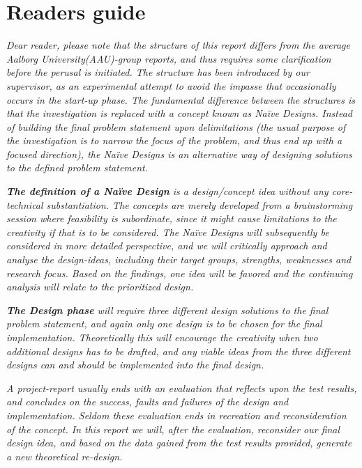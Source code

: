 \section{Readers guide}
\textit{Dear reader, please note that the structure of this report differs from the average Aalborg University(AAU)-group reports, and thus requires some clarification before the perusal is initiated. 
The structure has been introduced by our supervisor, as an experimental attempt to avoid the impasse that occasionally occurs in the start-up phase.
The fundamental difference between the structures is that the investigation is replaced with a concept known as Naïve Designs. Instead of building the final problem statement upon delimitations (the usual purpose of the investigation is to narrow the focus of the problem, and thus end up with a focused direction), the Naïve Designs is an alternative way of designing solutions to the defined problem statement.}
\bigskip

\textit{\textbf{The definition of a Naïve Design} is a design/concept idea without any core-technical substantiation. 
The concepts are merely developed from a brainstorming session where feasibility is subordinate, since it might cause limitations to the creativity if that is to be considered.	
The Naïve Designs will subsequently be considered in more detailed perspective, and we will critically approach and analyse the design-ideas, including their target groups, strengths, weaknesses and research focus. 
Based on the findings, one idea will be favored and the continuing analysis will relate to the prioritized design.}
\bigskip

\textit{\textbf{The Design phase} will require three different design solutions to the final problem statement, and again only one design is to be chosen for the final implementation. 
Theoretically this will encourage the creativity when two additional designs has to be drafted, and any viable ideas from the three different designs can and should be implemented into the final design.}
\bigskip

\textit{A project-report usually ends with an evaluation that reflects upon the test results, and concludes on the success, faults and failures of the design and implementation. 
Seldom these evaluation ends in recreation and reconsideration of the concept. 
In this report we will, after the evaluation, reconsider our final design idea, and based on the data gained from the test results provided, generate a new theoretical re-design.}
\bigskip

